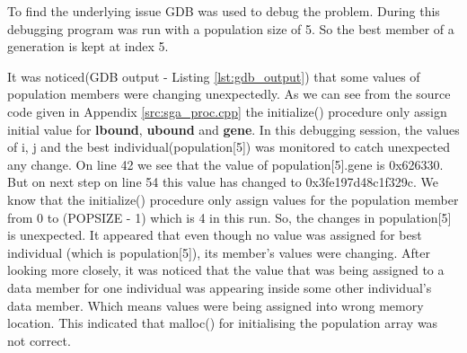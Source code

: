 To find the underlying issue GDB was used to debug the problem. During this debugging program was run with a population size of 5. So the best member of a generation is kept  at index 5.
 
It was noticed(GDB output - Listing \ref{lst:gdb_output}) that some values of population members were changing unexpectedly. As we can see from the source code given in Appendix \ref{src:sga_proc.cpp} the initialize() procedure only assign initial value for \textbf{lbound}, \textbf{ubound} and \textbf{gene}. In this debugging session, the values of i, j and the best individual(population[5]) was monitored to catch unexpected any change. On line 42 we see that the value of  population[5].gene is 0x626330. But on next step on line 54 this value has changed to 0x3fe197d48c1f329c. We know that the initialize() procedure only assign values for the population member from 0 to (POPSIZE - 1) which is 4 in this run. So, the changes in population[5] is unexpected. It appeared that even though no value was assigned for best individual (which is population[5]), its member's values were changing. After looking more closely, it was noticed that the value that was being assigned to a data member for one individual was appearing inside some other individual's data member. Which means values were being assigned into wrong memory location. This indicated that malloc() for initialising the population array was not correct.



